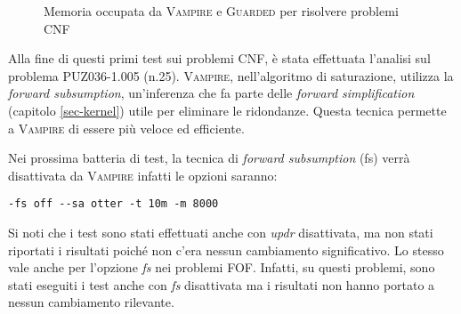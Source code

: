 \begin{figure}[H]
    \caption{Memoria occupata da \textsc{Vampire} e \textsc{Guarded} per risolvere problemi CNF}
\end{figure}

Alla fine di questi primi test sui problemi CNF, è stata effettuata l'analisi sul problema PUZ036-1.005 (n.25).
\textsc{Vampire}, nell'algoritmo di saturazione, utilizza la \emph{forward subsumption},
un'inferenza che fa parte delle \emph{forward simplification} (capitolo \ref{sec-kernel}) utile per eliminare le ridondanze.
Questa tecnica permette a \textsc{Vampire} di essere più veloce ed efficiente.

Nei prossima batteria di test, la tecnica di \emph{forward subsumption} (fs) verrà disattivata da \textsc{Vampire} 
infatti le opzioni saranno:
\begin{center}
    \verb|-fs off --sa otter -t 10m -m 8000|    
\end{center}
Si noti che i test sono stati effettuati anche con \emph{updr} disattivata, ma
non stati riportati i risultati poiché non c'era nessun cambiamento significativo. Lo stesso 
vale anche per l'opzione \emph{fs} nei problemi FOF. Infatti, su questi problemi, sono stati 
eseguiti i test anche con \emph{fs} disattivata ma i risultati non hanno portato a nessun cambiamento rilevante.

